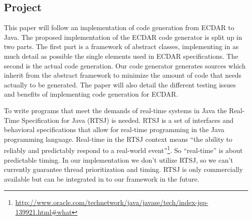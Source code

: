 \subsection{Project}
\label{introduction-problemfield}
This paper will follow an implementation of code generation from ECDAR to
Java. The proposed implementation of the ECDAR code generator is split up in two
parts. The first part is a framework of abstract classes, implementing in as
much detail as possible the single elements used in ECDAR specifications. The
second is the actual code generation. Our code generator generates sources which
inherit from the abstract framework to minimize the amount of code that needs
actually to be generated. The paper will also detail the different testing
issues and benefits of implementing code generation for ECDAR.

To write programs that meet the demands of real-time systems in Java the
Real-Time Specification for Java (RTSJ) is needed. RTSJ is a set of interfaces
and behavioral specifications that allow for real-time programming in the Java
programming language.  Real-time in the RTSJ context means ``the ability to
reliably and predictably respond to a real-world
event''\footnote{\url{http://www.oracle.com/technetwork/java/javase/tech/index-jsp-139921.html#what}}.
So ``real-time'' is about predictable timing. In our implementation we don't
utilize RTSJ, so we can't currently guarantee thread prioritization and
timing. RTSJ is only commercially available but can be integrated in to our
framework in the future.

